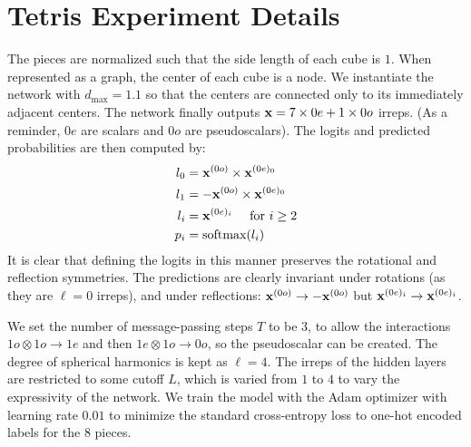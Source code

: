 \section{Tetris Experiment Details}
\label{sec:tetris-details}
The pieces are normalized such that the side length of each cube is $1$. When represented as a graph, the center of each cube is a node.
We instantiate the network with $d_\text{max} = 1.1$ so that the centers are connected only to its immediately adjacent centers. 
The network finally outputs $\mathbf{x} = 7\times0e + 1\times0o$ irreps. (As a reminder, $0e$ are scalars and $0o$ are pseudoscalars). The logits and predicted probabilities are then computed by:
\begin{align}
    l_0 &= \mathbf{x}^{(0o)} \times \mathbf{x}^{(0e)_0} \\
    l_1 &= -\mathbf{x}^{(0o)} \times \mathbf{x}^{(0e)_0} \\
    l_i &= \mathbf{x}^{(0e)_{i}} \quad \text{ for } i \geq 2 \\
    p_i &= \textrm{softmax}(l_i)
\end{align}
\[\]
It is clear that defining the logits in this manner preserves the rotational and reflection symmetries. The predictions are clearly invariant under rotations (as they are $\ell = 0$ irreps), and under reflections: $\mathbf{x}^{(0o)} \to -\mathbf{x}^{(0o)}$ but $\mathbf{x}^{(0e)_i} \to \mathbf{x}^{(0e)_i}$.

We set the number of message-passing steps $T$ to be $3$, to allow the interactions $1o \otimes 1o \to 1e$ and then $1e \otimes 1o \to 0o$, so the pseudoscalar can be created. The degree of spherical harmonics is kept as $\ell = 4$. The irreps of the hidden layers are restricted to some cutoff $L$, which is varied from $1$ to $4$ to vary the expressivity of the network.
We train the model with the Adam optimizer with learning rate $0.01$ to minimize the standard cross-entropy loss to one-hot encoded labels for the $8$ pieces.



